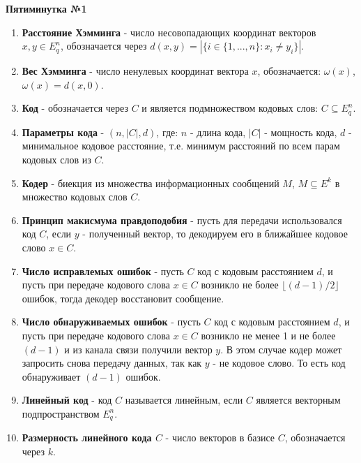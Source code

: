 \documentclass[a4paper, 12pt]{report}
\begin{document}
\pagecolor{white}
\color{black}
\textbf{Пятиминутка №1}

\begin{enumerate}
\item \textbf{Расстояние Хэмминга} - число несовопадающих координат векторов $x, y \in E_{q}^{n} $, обозначается через $d(x,y) = |\lbrace i \in \lbrace1, ... , n\rbrace : x_i \neq y_i \rbrace| $.

\item \textbf{Вес Хэмминга} - число ненулевых координат вектора $x $, обозначается: $\omega (x) $, $\omega (x) = d(x,0) $.

\item \textbf{Код} - обозначается через $C $ и является подмножеством кодовых слов: $C \subseteq E_{q}^{n} $.

\item \textbf{Параметры кода} - $(n, |C|, d) $, где:
$n $ - длина кода,
$|C| $ - мощность кода,
$d $ - минимальное кодовое расстояние, т.е. минимум расстояний по всем парам кодовых слов из $C $.

\item \textbf{Кодер} - биекция из множества информационных сообщений $M $, $M \subseteq E^{k}$ в множество кодовых слов $C $.

\item \textbf{Принцип макисмума правдоподобия} - пусть для передачи использовался код $C $, если $y $ - полученный вектор, то декодируем его в ближайшее кодовое слово $x\in C$. 

\item \textbf{Число исправлемых ошибок} - пусть $C $ код с кодовым расстоянием $d $, и пусть при передаче кодового слова $x \in C $ возникло не более $\lfloor (d-1)/2 \rfloor $ ошибок, тогда декодер восстановит сообщение. 

\item \textbf{Число обнаруживаемых ошибок} - пусть $C $ код с кодовым расстоянием $d $, и пусть при передаче кодового слова $x \in C $ возникло не менее 1 и не более $(d-1) $ и из канала связи получили вектор $y $. В этом случае кодер может запросить снова передачу данных, так как $y $ - не кодовое слово. То есть код обнаруживает $(d-1) $ ошибок.

\item \textbf{Линейный код} - код $C $ называется линейным, если $C $ является векторным подпространством $E_{q}^{n} $.

\item \textbf{Размерность линейного кода $C $} - число векторов в базисе $C $, обозначается через $k $.


\end{enumerate}
\end{document}
